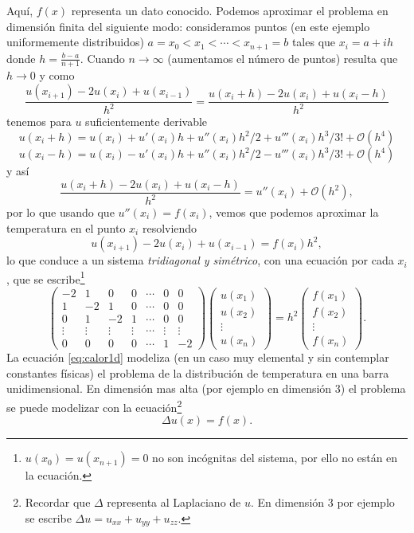 Aquí, $f(x)$ representa un dato conocido. Podemos aproximar el problema en dimensión finita del siguiente modo: consideramos puntos (en este ejemplo uniformemente distribuidos) $a=x_0<x_1<\cdots <x_{n+1}=b$ tales que $x_i=a+ih$ donde $h=\frac{b-a}{n+1}$.  Cuando $n\to \infty$ (aumentamos el número de puntos) resulta que $h\to 0$ y como
$$
\frac{u(x_{i+1})-2u(x_i)+u(x_{i-1})}{h^2}=
\frac{u(x_{i}+h)-2u(x_i)+u(x_{i}-h)}{h^2}
$$
tenemos para $u$ suficientemente derivable
$$
u(x_{i}+h)=u(x_{i})+u'(x_i)h+u''(x_i)h^2/2+u'''(x_i)h^3/3!+\mathcal{O}(h^4)
$$
$$
u(x_{i}-h)=u(x_{i})-u'(x_i)h+u''(x_i)h^2/2-u'''(x_i)h^3/3!+\mathcal{O}(h^4)
$$
y así
$$
\frac{u(x_{i}+h)-2u(x_i)+u(x_{i}-h)}{h^2}=u''(x_i)+\mathcal{O}(h^2),
$$
por lo que usando que $u''(x_i)=f(x_i)$, vemos que podemos aproximar la temperatura en el punto $x_i$ resolviendo
$$
u(x_{i+1})-2u(x_i)+u(x_{i-1})=f(x_i)h^2,
$$
lo que conduce a un sistema \emph{tridiagonal y simétrico}, con una ecuación por cada $x_i$,  que se escribe\footnote{$u(x_0)=u(x_{n+1})=0$ no son incógnitas del sistema, por ello no están en la ecuación.}
\begin{equation}
\label{eq:unid}
\begin{pmatrix}
-2&1&0&0&\cdots &0&0\\
1&-2&1&0&\cdots &0&0\\
0&1&-2&1&\cdots &0&0 \\
\vdots&\vdots&\vdots&\vdots&
\cdots &\vdots&\vdots\\
0&0&0&0&\cdots& 1&-2
\end{pmatrix}
\begin{pmatrix}
 u(x_1)\\
 u(x_2)\\
 \vdots\\
 u(x_n)
 \end{pmatrix}=h^2
 \begin{pmatrix}
 f(x_1)\\
 f(x_2)\\
 \vdots\\
 f(x_n)
 \end{pmatrix}.
\end{equation}
La ecuación \eqref{eq:calor1d} modeliza (en un caso muy elemental y sin contemplar constantes físicas) el problema de la distribución de temperatura en una barra unidimensional. En dimensión mas alta (por ejemplo en dimensión 3) el problema se puede modelizar con la  ecuación\footnote{Recordar que $\Delta$ representa al Laplaciano de $u$. En dimensión 3 por ejemplo se escribe $\Delta u=u_{xx}+u_{yy}+u_{zz}$.}
$$
\Delta u(x)=f(x).
$$
